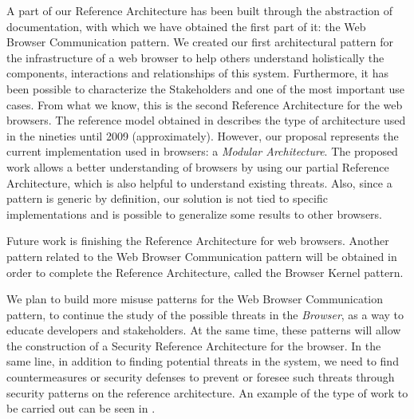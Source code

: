\documentclass[prodmode,acmtecs]{acmsmall}
\begin{document}
A part of our Reference Architecture has been built through the abstraction of documentation, with which we have obtained the first part of it: the Web Browser Communication pattern. We created our first architectural pattern for the infrastructure of a web browser to help others understand holistically the components, interactions and relationships of this system. Furthermore, it has been possible to characterize the Stakeholders and one of the most important use cases. From what we know, this is the second Reference Architecture for the web browsers. The reference model obtained in \cite{2005-grosskurth-browser-refarch} describes the type of architecture used in the nineties until 2009 (approximately). However, our proposal represents the current implementation used in browsers: a \textit{Modular Architecture}. The proposed work allows a better understanding of browsers by using our partial Reference Architecture, which is also helpful to understand existing threats. Also, since a pattern is generic by definition, our solution is not tied to specific implementations and is possible to generalize some results to other browsers. 

Future work is finishing the Reference Architecture for web browsers. Another pattern related to the Web Browser Communication pattern will be obtained in order to complete the Reference Architecture, called the Browser Kernel pattern. 

We plan to build more \cite{silva2015b} misuse patterns for the Web Browser Communication pattern, to continue the study of the possible threats in the \textit{Browser}, as a way to educate developers and stakeholders. At the same time, these patterns will allow the construction of a Security Reference Architecture for the browser. In the same line, in addition to finding potential threats in the system, we need to find countermeasures or security defenses to prevent or foresee such threats through security patterns on the reference architecture. An example of the type of work to be carried out can be seen in \cite{Fernandez2015}.

\end{document}
